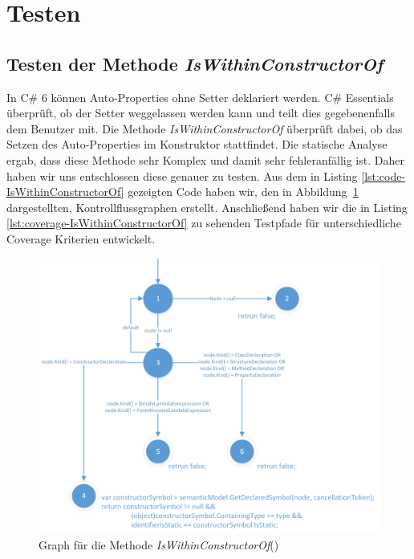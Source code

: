 %
\section{Testen}



\subsection{Testen der Methode \textit{IsWithinConstructorOf}}
In C\# 6 können Auto-Properties ohne Setter deklariert werden.\cite{csharp6} C\# Essentials überprüft, ob der Setter weggelassen werden kann und teilt dies gegebenenfalls dem Benutzer mit. Die Methode \textit{IsWithinConstructorOf} überprüft dabei, ob das Setzen des Auto-Properties im Konstruktor stattfindet. Die statische Analyse ergab, dass diese Methode sehr Komplex und damit sehr fehleranfällig ist. Daher haben wir uns entschlossen diese genauer zu testen. Aus dem in Listing \ref{lst:code-IsWithinConstructorOf} gezeigten Code haben wir, den in Abbildung~\ref{fig:graph-constructor} dargestellten, Kontrollflussgraphen erstellt. Anschließend haben wir die in Listing \ref{lst:coverage-IsWithinConstructorOf} zu sehenden Testpfade für unterschiedliche Coverage Kriterien entwickelt.\\
\begin{figure}
	\centering
	\includegraphics[width=\textwidth]{images/GraphIsWithinConstructorOf.png}
	\caption{Graph für die Methode \textit{IsWithinConstructorOf}()}
	\label{fig:graph-constructor}
\end{figure}
